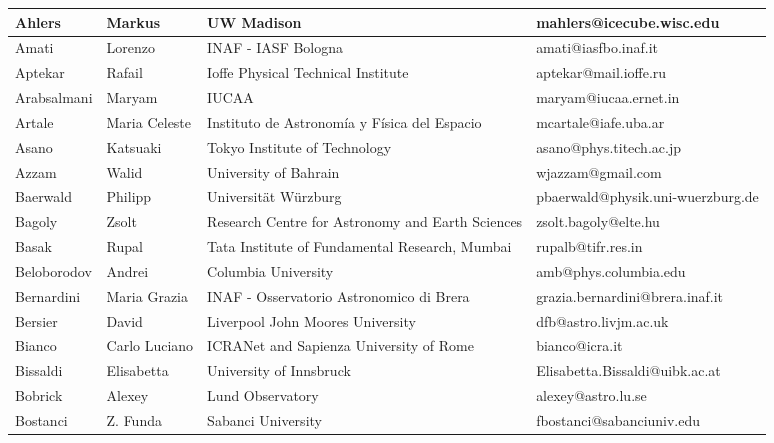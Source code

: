 \begin{center}
  \begin{longtable}{|p{1.6cm} |p{1.6cm} |p{2cm} |p{3cm} |}
    \hline
\tiny Ahlers &\tiny Markus & \tiny UW Madison & \tiny mahlers@icecube.wisc.edu \\ \hline
\tiny Amati &\tiny Lorenzo & \tiny INAF - IASF Bologna & \tiny amati@iasfbo.inaf.it \\ \hline
\tiny Aptekar &\tiny Rafail & \tiny Ioffe Physical Technical Institute & \tiny aptekar@mail.ioffe.ru \\ \hline
\tiny Arabsalmani &\tiny Maryam & \tiny IUCAA & \tiny maryam@iucaa.ernet.in \\ \hline
\tiny Artale &\tiny Maria Celeste & \tiny Instituto de Astronom\'ia y F\'isica del Espacio & \tiny mcartale@iafe.uba.ar \\ \hline
\tiny Asano &\tiny Katsuaki & \tiny Tokyo Institute of Technology & \tiny asano@phys.titech.ac.jp \\ \hline
\tiny Azzam &\tiny Walid & \tiny University of Bahrain & \tiny wjazzam@gmail.com \\ \hline
\tiny Baerwald &\tiny Philipp & \tiny Universit\"at W\"urzburg & \tiny pbaerwald@physik.uni-wuerzburg.de \\ \hline
\tiny Bagoly &\tiny Zsolt & \tiny Research Centre for Astronomy and Earth Sciences & \tiny zsolt.bagoly@elte.hu \\ \hline
\tiny Basak &\tiny Rupal & \tiny Tata Institute of Fundamental Research, Mumbai & \tiny rupalb@tifr.res.in \\ \hline
\tiny Beloborodov &\tiny Andrei & \tiny Columbia University & \tiny amb@phys.columbia.edu \\ \hline
\tiny Bernardini &\tiny Maria Grazia & \tiny INAF - Osservatorio Astronomico di Brera & \tiny grazia.bernardini@brera.inaf.it \\ \hline
\tiny Bersier &\tiny David & \tiny Liverpool John Moores University & \tiny dfb@astro.livjm.ac.uk \\ \hline
\tiny Bianco &\tiny Carlo Luciano & \tiny ICRANet and Sapienza University of Rome & \tiny bianco@icra.it \\ \hline
\tiny Bissaldi &\tiny Elisabetta & \tiny University of Innsbruck & \tiny Elisabetta.Bissaldi@uibk.ac.at \\ \hline
\tiny Bobrick &\tiny Alexey & \tiny Lund Observatory & \tiny alexey@astro.lu.se \\ \hline
\tiny Bostanci &\tiny Z. Funda & \tiny Sabanci University & \tiny fbostanci@sabanciuniv.edu \\ \hline

\end{longtable}
\end{center}
